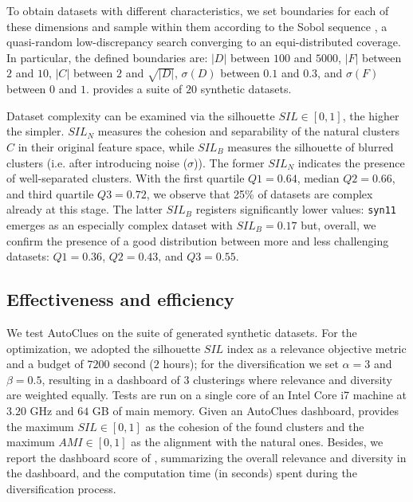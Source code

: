 To obtain datasets with different characteristics, we set boundaries for each of these dimensions and sample within them according to the Sobol sequence \cite{sobol1967distribution}, a quasi-random low-discrepancy search converging to an equi-distributed coverage.
In particular, the defined boundaries are: $|D|$ between $100$ and $5000$, $|F|$ between $2$ and $10$, $|C|$ between $2$ and $\sqrt{|D|}$, $\sigma(D)$ between $0.1$ and $0.3$, and $\sigma(F)$ between $0$ and $1$.
 provides a suite of $20$ synthetic datasets.

Dataset complexity can be examined via the silhouette $SIL \in [0, 1]$, the higher the simpler.
$SIL_N$ measures the cohesion and separability of the natural clusters $C$ in their original feature space, while  $SIL_B$ measures the silhouette of blurred clusters (i.e. after introducing noise ($\sigma$)).
The former $SIL_N$ indicates the presence of well-separated clusters.
With the first quartile $Q1=0.64$, median $Q2=0.66$, and third quartile $Q3=0.72$, we observe that 25\% of datasets are complex already at this stage.
The latter $SIL_B$ registers significantly lower values: \texttt{syn11} emerges as an especially complex dataset with $SIL_B=0.17$ but, overall, we confirm the presence of a good distribution between more and less challenging datasets: $Q1 = 0.36$, $Q2 = 0.43$, and $Q3 = 0.55$.

\vspace{-0.2cm}
\subsection{Effectiveness and efficiency}
\label{clustering-ssec:effectiveness}


We test AutoClues on the suite of generated synthetic datasets.
For the optimization, we adopted the silhouette $SIL$ index as a relevance objective metric and a budget of $7200$ second ($2$ hours); for the diversification we set $\alpha=3$ and $\beta=0.5$, resulting in a dashboard of $3$ clusterings where relevance and diversity are weighted equally.
Tests are run on a single core of an Intel Core i7 machine at $3.20$ GHz and $64$ GB of main memory.
%
Given an AutoClues dashboard,  provides
the maximum $SIL\in [0, 1]$ as the cohesion of the found clusters and the maximum $AMI \in [0, 1]$ as the alignment with the natural ones. Besides, we report the dashboard score of , summarizing the overall relevance and diversity in the dashboard, and the computation time (in seconds) spent during the diversification process. 

